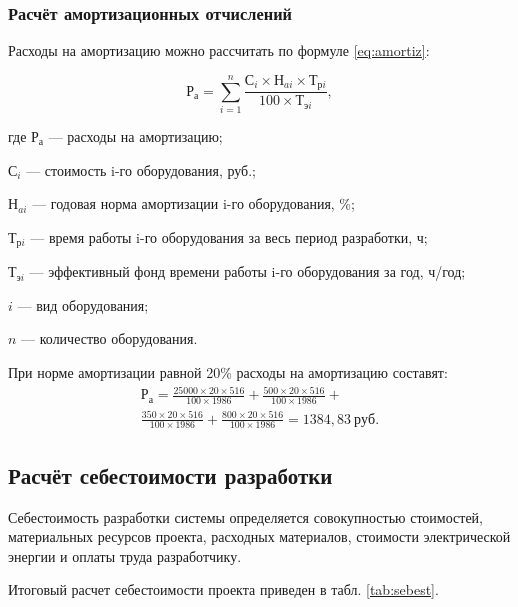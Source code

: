 \subsubsection{Расчёт амортизационных отчислений}

Расходы на амортизацию можно рассчитать по формуле \ref{eq:amortiz}:

\begin{equation}
	\label{eq:amortiz}
	Р_{а} = \sum^{n}_{i=1} \frac{С_i \times Н_{ai} \times Т_{рi}}{100 \times Т_{эi}},
\end{equation}
\begin{ESKDexplanation}
	\item где $Р_{а}$ --- расходы на амортизацию;
	\item $С_i$ --- стоимость i-го оборудования, руб.;
	\item $Н_{ai}$ --- годовая норма амортизации i-го оборудования, \%;
	\item $Т_{рi}$ --- время работы i-го оборудования за весь период разработки, ч;
	\item $Т_{эi}$ --- эффективный фонд времени работы i-го оборудования за год, ч/год;
	\item $i$ --- вид оборудования;
	\item $n$ --- количество оборудования.
\end{ESKDexplanation}

При норме амортизации равной 20\% расходы на амортизацию составят:
\begin{equation*}
\begin{split}
	Р_{а} = 
	\frac{25000 \times 20 \times 516}{100 \times 1986} + 
	\frac{500 \times 20 \times 516}{100 \times 1986} + \\
	\frac{350 \times 20 \times 516}{100 \times 1986} + 
	\frac{800 \times 20 \times 516}{100 \times 1986} =
	1384,83~руб.
\end{split}
\end{equation*}

\subsection{Расчёт себестоимости разработки}

Себестоимость разработки системы определяется совокупностью стоимостей, материальных ресурсов проекта, расходных материалов, стоимости электрической энергии и оплаты труда разработчику.

Итоговый расчет себестоимости проекта приведен в табл. \ref{tab:sebest}.

